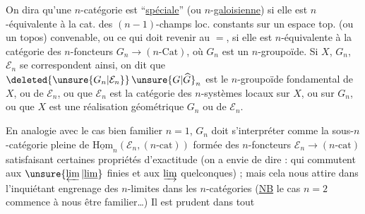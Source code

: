 On dira qu'une $n$-catégorie  est ``\uline{spéciale}'' (ou $n$-\uline{galoisienne}) si elle est $n$-équivalente à la cat. des $(n-1)$-champs loc. constants sur un espace top. (ou un topos) convenable, ou ce qui doit revenir au $=$, si elle est $n$-équivalente à la catégorie des $n$-foncteurs $G_n\longrightarrow(n\text{-}\mathrm{Cat})$, où $G_n$ est un $n$-groupoïde. Si $X$, $G_n$, $\mathcal E_n$ se correspondent ainsi, on dit que $\deleted{\unsure{G_n|\mathcal E_n}}\,\unsure{G|\widehat G}_n$ est le $n$-groupoïde fondamental de $X$, ou de $\mathcal E_n$, ou que $\mathcal E_n$ est la catégorie des $n$-systèmes locaux sur $X$, ou sur $G_n$, ou que $X$ est une réalisation géométrique  $G_n$ ou de $\mathcal E_n$.

En analogie avec le cas bien familier $n=1$, $G_n$ doit s'interpréter comme la sous-$n$-catégorie pleine de $\underline{\mathrm{Hom}}_n(\mathcal E_n,(n\text{-}\mathrm{cat}))$ formée des $n$-foncteurs $\mathcal E_n\to(n\text{-}\mathrm{cat})$ satisfaisant certaines propriétés d'exactitude (on a envie de dire : qui commutent aux $\unsure{\varprojlim|\underline{\lim}}$ finies et aux $\varinjlim$ quelconques) ; mais cela nous attire dans l'inquiétant engrenage des $n$-limites dans les $n$-catégories (\uline{NB} le cas $n=2$ commence à nous être familier\ldots) Il est prudent dans tout
